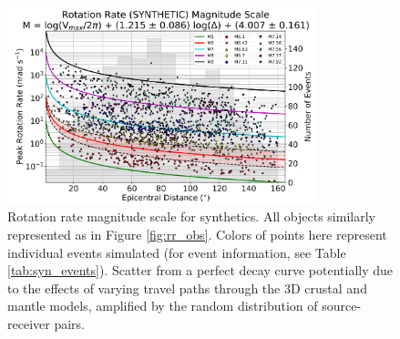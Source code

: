 \documentclass{gji}
\begin{document}
\begin{figure}
\centerline{\includegraphics[width=0.8\textwidth]{RR_SYN}}
\caption{Rotation rate magnitude scale for synthetics. All objects similarly represented as in Figure \ref{fig:rr_obs}. Colors of points here represent individual events simulated (for event information, see Table \ref{tab:syn_events}). Scatter from a perfect decay curve potentially due to the effects of varying travel paths through the 3D crustal and mantle models, amplified by the random distribution of source-receiver pairs.}
\label{fig:syn_scale}
\end{figure}
\end{document}
